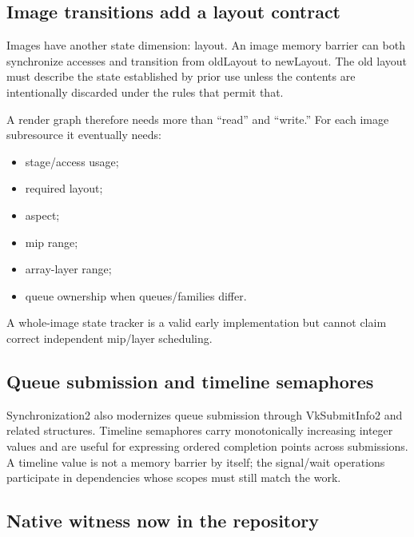 \subsection{Image transitions add a layout contract}\label{appendix-f15ce0d9c170-image-transitions-add-a-layout-contract}

\hypertarget{appendix-f15ce0d9c170-image-transitions-add-a-layout-contract}{}

Images have another state dimension: layout. An image memory barrier can both synchronize accesses and transition from oldLayout to newLayout. The old layout must describe the state established by prior use unless the contents are intentionally discarded under the rules that permit that.

A render graph therefore needs more than ``read'' and ``write.'' For each image subresource it eventually needs:

\begin{itemize}
\tightlist
\item
  stage/access usage;
\item
  required layout;
\item
  aspect;
\item
  mip range;
\item
  array-layer range;
\item
  queue ownership when queues/families differ.
\end{itemize}

A whole-image state tracker is a valid early implementation but cannot claim correct independent mip/layer scheduling.

\subsection{Queue submission and timeline semaphores}\label{appendix-f15ce0d9c170-queue-submission-and-timeline-semaphores}

\hypertarget{appendix-f15ce0d9c170-queue-submission-and-timeline-semaphores}{}

Synchronization2 also modernizes queue submission through VkSubmitInfo2 and related structures. Timeline semaphores carry monotonically increasing integer values and are useful for expressing ordered completion points across submissions. A timeline value is not a memory barrier by itself; the signal/wait operations participate in dependencies whose scopes must still match the work.

\subsection{Native witness now in the repository}\label{appendix-f15ce0d9c170-native-witness-now-in-the-repository}

